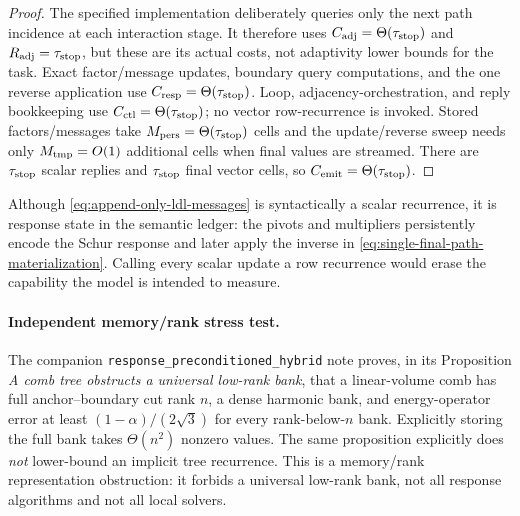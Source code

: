 \begin{proof}
The specified implementation deliberately queries only the next path
incidence at each interaction stage.  It therefore uses
$C_{\rm adj}=\Theta(\tau_{\rm stop})$ and
$R_{\rm adj}=\tau_{\rm stop}$, but these are its actual costs, not
adaptivity lower bounds for the task.  Exact factor/message updates, boundary
query computations, and the one reverse application use
$C_{\rm resp}=\Theta(\tau_{\rm stop})$.  Loop, adjacency-orchestration, and
reply bookkeeping use $C_{\rm ctl}=\Theta(\tau_{\rm stop})$; no vector
row-recurrence is invoked.  Stored factors/messages take
$M_{\rm pers}=\Theta(\tau_{\rm stop})$ cells and the update/reverse sweep needs
only $M_{\rm tmp}=O(1)$ additional cells when final values are streamed.
There are $\tau_{\rm stop}$ scalar replies and $\tau_{\rm stop}$ final vector
cells, so $C_{\rm emit}=\Theta(\tau_{\rm stop})$.
\end{proof}

Although \cref{eq:append-only-ldl-messages} is syntactically a scalar
recurrence, it is response state in the semantic ledger: the pivots and
multipliers persistently encode the Schur response and later apply the inverse
in \cref{eq:single-final-path-materialization}.  Calling every scalar update a
row recurrence would erase the capability the model is intended to measure.

\paragraph{Independent memory/rank stress test.}
The companion \texttt{response\_preconditioned\_hybrid} note proves, in its
Proposition \emph{A comb tree obstructs a universal low-rank bank}, that a
linear-volume comb has full anchor--boundary cut rank $n$, a dense harmonic
bank, and energy-operator error at least
$(1-\alpha)/(2\sqrt3)$ for every rank-below-$n$ bank.  Explicitly storing the
full bank takes $\Theta(n^2)$ nonzero values.  The same proposition explicitly
does \emph{not} lower-bound an implicit tree recurrence.  This is a
memory/rank representation obstruction: it forbids a universal low-rank bank,
not all response algorithms and not all local solvers.
